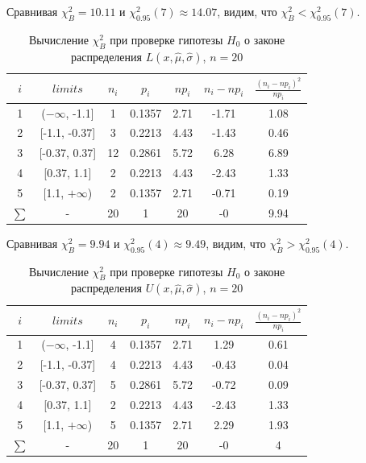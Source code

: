 \documentclass[main.tex]{subfiles}
\begin{document}
\noindent Сравнивая $\chi^{2}_{B} = 10.11$ и $\chi^{2}_{0.95}(7) \approx 14.07$,
видим, что $\chi^{2}_{B} < \chi^{2}_{0.95}(7)$.

\begin{table}[ht]
	\centering
	\begin{tabular}{| c | c | c | c | c | c | c |}
		\hline
		$i$ & $limits$         &   $n_i$ &    $p_i$ &   $np_i$ &   $n_i - np_i$ &   $\frac{(n_i-np_i)^2}{np_i}$ \\
		\hline
		1 & ($-\infty$, -1.1] &     1 & 0.1357 &   2.71 &        -1.71 &                        1.08 \\
		2 & [-1.1, -0.37]  &     3 & 0.2213 &   4.43 &        -1.43 &                        0.46 \\
		3 & [-0.37, 0.37]  &    12 & 0.2861 &   5.72 &         6.28 &                        6.89 \\
		4 & [0.37, 1.1]    &     2 & 0.2213 &   4.43 &        -2.43 &                        1.33 \\
		5 & [1.1, $+\infty$)   &     2 & 0.1357 &   2.71 &        -0.71 &                        0.19 \\
		$\sum$ & -              &    20 & 1      &  20    &        -0    &                        9.94 \\
		\hline
	\end{tabular}
	\caption{ Вычисление $\chi^{2}_{B}$ при проверке гипотезы $H_{0}$ о законе распределения $L(x,\hat{\mu}, \hat{\sigma})$, $n=20$}
	\label{tab:laplace_chi_2}
\end{table}
\noindent Сравнивая $\chi^{2}_{B} = 9.94$ и $\chi^{2}_{0.95}(4) \approx 9.49$, видим, что $\chi^{2}_{B} > \chi^{2}_{0.95}(4)$.

\begin{table}[ht]
	\centering
	\begin{tabular}{| c | c | c | c | c | c | c |}
		\hline
		$i$ & $limits$         &   $n_i$ &    $p_i$ &   $np_i$ &   $n_i - np_i$ &   $\frac{(n_i-np_i)^2}{np_i}$ \\
		\hline
		1 & ($-\infty$, -1.1] &     4 & 0.1357 &   2.71 &         1.29 &                        0.61 \\
		2 & [-1.1, -0.37]  &     4 & 0.2213 &   4.43 &        -0.43 &                        0.04 \\
		3 & [-0.37, 0.37]  &     5 & 0.2861 &   5.72 &        -0.72 &                        0.09 \\
		4 & [0.37, 1.1]    &     2 & 0.2213 &   4.43 &        -2.43 &                        1.33 \\
		5 & [1.1, $+\infty$)   &     5 & 0.1357 &   2.71 &         2.29 &                        1.93 \\
		$\sum$ & -              &    20 & 1      &  20    &        -0    &                        4    \\
		\hline
	\end{tabular}
	\caption{ Вычисление $\chi^{2}_{B}$ при проверке гипотезы $H_{0}$ о законе распределения $U(x,\hat{\mu}, \hat{\sigma})$, $n=20$}
	\label{tab:uniform_chi_2}
\end{table}
\end{document}
